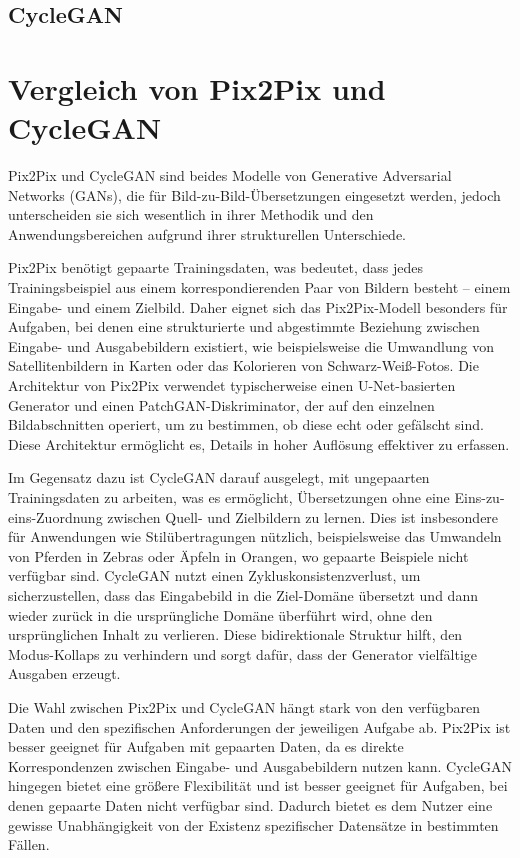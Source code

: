 \subsection{CycleGAN}

\section{Vergleich von Pix2Pix und CycleGAN}
Pix2Pix und CycleGAN sind beides Modelle von Generative Adversarial Networks (GANs), die für Bild-zu-Bild-Übersetzungen eingesetzt werden, jedoch unterscheiden sie sich wesentlich in ihrer Methodik und den Anwendungsbereichen aufgrund ihrer strukturellen Unterschiede.

Pix2Pix benötigt gepaarte Trainingsdaten, was bedeutet, dass jedes Trainingsbeispiel aus einem korrespondierenden Paar von Bildern besteht – einem Eingabe- und einem Zielbild. Daher eignet sich das Pix2Pix-Modell besonders für Aufgaben, bei denen eine strukturierte und abgestimmte Beziehung zwischen Eingabe- und Ausgabebildern existiert, wie beispielsweise die Umwandlung von Satellitenbildern in Karten oder das Kolorieren von Schwarz-Weiß-Fotos. Die Architektur von Pix2Pix verwendet typischerweise einen U-Net-basierten Generator und einen PatchGAN-Diskriminator, der auf den einzelnen Bildabschnitten operiert, um zu bestimmen, ob diese echt oder gefälscht sind. Diese Architektur ermöglicht es, Details in hoher Auflösung effektiver zu erfassen.

Im Gegensatz dazu ist CycleGAN darauf ausgelegt, mit ungepaarten Trainingsdaten zu arbeiten, was es ermöglicht, Übersetzungen ohne eine Eins-zu-eins-Zuordnung zwischen Quell- und Zielbildern zu lernen. Dies ist insbesondere für Anwendungen wie Stilübertragungen nützlich, beispielsweise das Umwandeln von Pferden in Zebras oder Äpfeln in Orangen, wo gepaarte Beispiele nicht verfügbar sind. CycleGAN nutzt einen Zykluskonsistenzverlust, um sicherzustellen, dass das Eingabebild in die Ziel-Domäne übersetzt und dann wieder zurück in die ursprüngliche Domäne überführt wird, ohne den ursprünglichen Inhalt zu verlieren. Diese bidirektionale Struktur hilft, den Modus-Kollaps zu verhindern und sorgt dafür, dass der Generator vielfältige Ausgaben erzeugt.

Die Wahl zwischen Pix2Pix und CycleGAN hängt stark von den verfügbaren Daten und den spezifischen Anforderungen der jeweiligen Aufgabe ab. Pix2Pix ist besser geeignet für Aufgaben mit gepaarten Daten, da es direkte Korrespondenzen zwischen Eingabe- und Ausgabebildern nutzen kann. CycleGAN hingegen bietet eine größere Flexibilität und ist besser geeignet für Aufgaben, bei denen gepaarte Daten nicht verfügbar sind. Dadurch bietet es dem Nutzer eine gewisse Unabhängigkeit von der Existenz spezifischer Datensätze in bestimmten Fällen.

